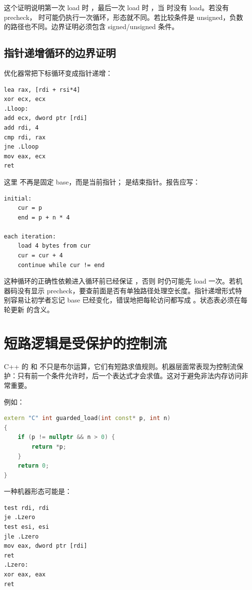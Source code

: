 这个证明说明第一次 load 时 ，最后一次 load 时 ，当  时没有 load。若没有 precheck， 时可能仍执行一次循环，形态就不同。若比较条件是 unsigned，负数  的路径也不同。边界证明必须包含 signed/unsigned 条件。

\subsection{指针递增循环的边界证明}

优化器常把下标循环变成指针递增：

\begin{lstlisting}
lea rax, [rdi + rsi*4]
xor ecx, ecx
.Lloop:
add ecx, dword ptr [rdi]
add rdi, 4
cmp rdi, rax
jne .Lloop
mov eax, ecx
ret
\end{lstlisting}

这里  不再是固定 base，而是当前指针； 是结束指针。报告应写：

\begin{lstlisting}
initial:
    cur = p
    end = p + n * 4

each iteration:
    load 4 bytes from cur
    cur = cur + 4
    continue while cur != end
\end{lstlisting}

这种循环的正确性依赖进入循环前已经保证 ，否则  时仍可能先 load 一次。若机器码没有显示 precheck，要查前面是否有单独路径处理空长度。指针递增形式特别容易让初学者忘记 base 已经变化，错误地把每轮访问都写成 。状态表必须在每轮更新  的含义。

\section{短路逻辑是受保护的控制流}

C++ 的 \code{&&} 和 \code{||} 不只是布尔运算，它们有短路求值规则。机器层面常表现为控制流保护：只有前一个条件允许时，后一个表达式才会求值。这对于避免非法内存访问非常重要。

例如：

\begin{lstlisting}[language=C++]
extern "C" int guarded_load(int const* p, int n)
{
    if (p != nullptr && n > 0) {
        return *p;
    }
    return 0;
}
\end{lstlisting}

一种机器形态可能是：

\begin{lstlisting}
test rdi, rdi
je .Lzero
test esi, esi
jle .Lzero
mov eax, dword ptr [rdi]
ret
.Lzero:
xor eax, eax
ret
\end{lstlisting}

